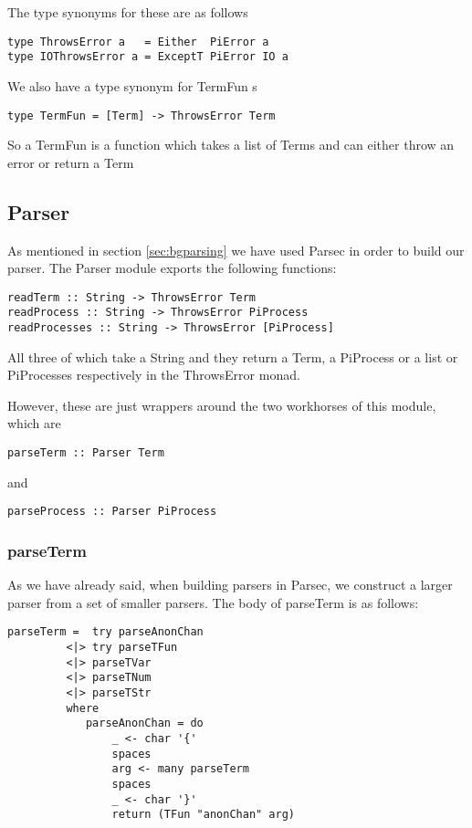 The type synonyms for these are as follows

\begin{verbatim}
type ThrowsError a   = Either  PiError a
type IOThrowsError a = ExceptT PiError IO a
\end{verbatim}

We also have a type synonym for TermFun s

\label{sec:termfun}
\begin{verbatim}
type TermFun = [Term] -> ThrowsError Term
\end{verbatim}

So a TermFun is a function which takes a list of Terms and can either throw an error or return a Term

\subsection{Parser}
\label{subsec:parser}

As mentioned in section \ref{sec:bgparsing} we have used Parsec in order to build our parser. The Parser module exports the following functions:

\begin{verbatim}
readTerm :: String -> ThrowsError Term 
readProcess :: String -> ThrowsError PiProcess
readProcesses :: String -> ThrowsError [PiProcess]
\end{verbatim}

All three of which take a String and they return a Term, a PiProcess or a list or PiProcesses respectively in the ThrowsError monad. 

However, these are just wrappers around the two workhorses of this module, which are
\begin{verbatim}
parseTerm :: Parser Term
\end{verbatim}
and 
\begin{verbatim}
parseProcess :: Parser PiProcess
\end{verbatim}

\subsubsection{parseTerm}
As we have already said, when building parsers in Parsec, we construct a larger parser from a set of smaller parsers.
The body of parseTerm is as follows:
\begin{verbatim}
parseTerm =  try parseAnonChan
         <|> try parseTFun
         <|> parseTVar
         <|> parseTNum
         <|> parseTStr
         where
            parseAnonChan = do
                _ <- char '{'
                spaces
                arg <- many parseTerm
                spaces
                _ <- char '}'
                return (TFun "anonChan" arg)
\end{verbatim}

